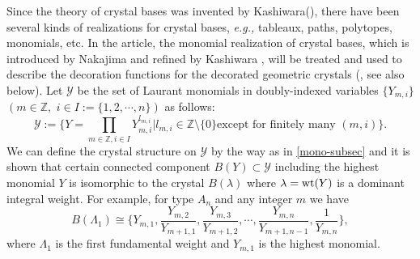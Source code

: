 Since the theory of crystal bases was invented by
Kashiwara(\cite{K0,K1}),
there have been several kinds of realizations for crystal bases, 
{\it e.g.,} tableaux,
paths, polytopes, monomials, etc.
In the article, the monomial realization of crystal bases, which 
is introduced by Nakajima \cite{Nj} and refined by Kashiwara \cite{K7},
will be treated and used to describe the decoration functions for the
decorated geometric crystals (\cite{BK2}, see also below).
Let ${{\mathcal Y}}$ be the set of Laurant monomials in doubly-indexed variables
$\{Y_{m,i}\}$ $(m\in{\mathbb Z},\,\,i\in I:=\{1,2,{\cdots},n\})$ as follows:
\[
  {{\mathcal Y}}:=\{Y=\prod_{m\in{\mathbb Z},i\in I}
Y_{m,i}^{l_{m,i}}|l_{m,i}\in {\mathbb Z}\setminus\{0\}\text{
 except for finitely many }(m,i)\}.
\]
We can define the crystal structure on ${{\mathcal Y}}$ 
by the way as in \ref{mono-subsec} and it is shown that certain
connected component 
$B(Y)\subset {{\mathcal Y}}$ including the highest monomial $Y$ 
is isomorphic to the crystal $B({\lambda})$
where ${\lambda}={{\rm wt}}(Y)$ is a dominant integral weight.
For example, for type $A_n$ and any integer $m$ we have
\[
 B({\Lambda}_1)\cong\{Y_{m,1},\frac{Y_{m,2}}{Y_{m+1,1}},\frac{Y_{m,3}}{Y_{m+1,2}},
{\cdots},\frac{Y_{m,n}}{Y_{m+1,n-1}},\frac{1}{Y_{m,n}}\},
\]
where ${\Lambda}_1$ is the first fundamental weight and $Y_{m,1}$ is the 
highest monomial.

